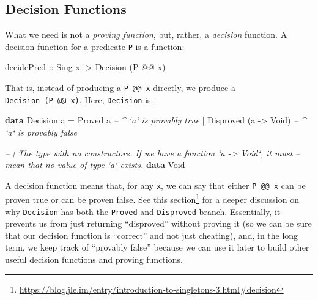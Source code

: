 \documentclass[]{article}
\newenvironment{Shaded}{}{}
\newcommand{\CommentTok}[1]{\textcolor[rgb]{0.38,0.63,0.69}{\textit{#1}}}
\newcommand{\DataTypeTok}[1]{\textcolor[rgb]{0.56,0.13,0.00}{#1}}
\newcommand{\FunctionTok}[1]{\textcolor[rgb]{0.02,0.16,0.49}{#1}}
\newcommand{\KeywordTok}[1]{\textcolor[rgb]{0.00,0.44,0.13}{\textbf{#1}}}
\newcommand{\NormalTok}[1]{#1}
\newcommand{\OtherTok}[1]{\textcolor[rgb]{0.00,0.44,0.13}{#1}}
\renewcommand{\href}[2]{#2\footnote{\url{#1}}}
\begin{document}
\hypertarget{decision-functions}{%
\subsection{Decision Functions}\label{decision-functions}}

What we need is not a \emph{proving function}, but, rather, a \emph{decision}
function. A decision function for a predicate \texttt{P} is a function:

\begin{Shaded}
\begin{Highlighting}[]
\OtherTok{decidePred ::} \DataTypeTok{Sing}\NormalTok{ x}
           \OtherTok{->} \DataTypeTok{Decision}\NormalTok{ (}\DataTypeTok{P} \FunctionTok{@@}\NormalTok{ x)}
\end{Highlighting}
\end{Shaded}

That is, instead of producing a \texttt{P\ @@\ x} directly, we produce a
\texttt{Decision\ (P\ @@\ x)}. Here, \texttt{Decision} is:

\begin{Shaded}
\begin{Highlighting}[]
\KeywordTok{data} \DataTypeTok{Decision}\NormalTok{ a}
    \FunctionTok{=} \DataTypeTok{Proved}\NormalTok{     a                }\CommentTok{-- ^ `a` is provably true}
    \FunctionTok{|} \DataTypeTok{Disproved}\NormalTok{ (a }\OtherTok{->} \DataTypeTok{Void}\NormalTok{)       }\CommentTok{-- ^ `a` is provably false}

\CommentTok{-- | The type with no constructors.  If we have a function `a -> Void`, it must}
\CommentTok{-- mean that no value of type `a` exists.}
\KeywordTok{data} \DataTypeTok{Void}
\end{Highlighting}
\end{Shaded}

A decision function means that, for any \texttt{x}, we can say that either
\texttt{P\ @@\ x} can be proven true or can be proven false. See
\href{https://blog.jle.im/entry/introduction-to-singletons-3.html\#decision}{this
section} for a deeper discussion on why \texttt{Decision} has both the
\texttt{Proved} and \texttt{Disproved} branch. Essentially, it prevents us from
just returning ``disproved'' without proving it (so we can be sure that our
decision function is ``correct'' and not just cheating), and, in the long term,
we keep track of ``provably false'' because we can use it later to build other
useful decision functions and proving functions.
\end{document}
